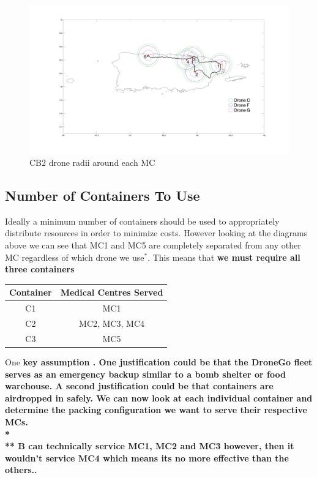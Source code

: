 \documentclass[a4paper,12pt]{article}
\begin{document}
\begin{figure}[p]
\centering
\includegraphics[scale =0.15]{CB2}
\caption{CB2 drone radii around each MC}
\label{cb2}
\end{figure}

\newpage

\subsection{Number of Containers To Use}
Ideally a minimum number of containers should be used to appropriately distribute resources in order to minimize costs.
However looking at the diagrams above we can see that MC1 and MC5 are completely separated from any other MC regardless
of which drone we use$^{*}$. This means that \bf{we must require all three containers} 

\begin{center}
\begin{tabular}{ |c|c| }
 \hline
 Container & Medical Centres Served \\\hline
  C1 & MC1 \\
  C2 & MC2, MC3, MC4  \\
  C3 & MC5 \\
 \hline
\end{tabular}
\end{center}

One \bf{key assumption} . One justification could be that the DroneGo fleet serves as an emergency backup similar to a bomb shelter or food warehouse.
A second justification could be that containers are airdropped in safely.
We can now look at each individual container and determine the packing configuration we want to serve their respective MCs.\\*
\\**
\footnotesize{B can technically service MC1, MC2 and MC3 however, then it wouldn't service MC4 which means its no more effective than the others.}\normalsize{.}
\end{document}
